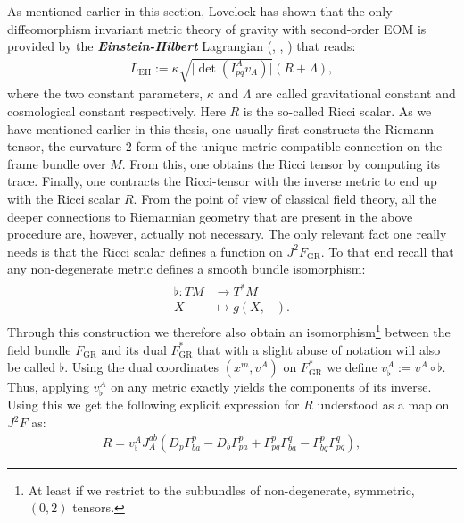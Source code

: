 As mentioned earlier in this section, Lovelock has shown that the only diffeomorphism invariant metric theory of gravity with second-order EOM is provided by the \textit{\textbf{Einstein-Hilbert}} Lagrangian (\cite{Lovelock1969}, \cite{doi:10.1063/1.1665613}, \cite{doi:10.1063/1.1666069}) that reads:
\begin{align}
    L_{\text{EH}} := \kappa \sqrt{\vert \operatorname{det} \left ( I^A_{pq}v_A \right ) \vert }  \left( R + \Lambda \right ),
\end{align}
where the two constant parameters, $\kappa$ and $\Lambda$ are called gravitational constant and cosmological constant respectively. Here $R$ is the so-called Ricci scalar. As we have mentioned earlier in this thesis, one usually first constructs the Riemann tensor, the curvature  $2$-form of the unique metric compatible connection on the frame bundle over $M$. From this, one obtains the Ricci tensor by computing its trace. Finally, one contracts the Ricci-tensor with the inverse metric to end up with the Ricci scalar $R$. From the point of view of classical field theory, all the deeper connections to Riemannian geometry that are present in the above procedure are, however, actually not necessary. The only relevant fact one really needs is that the Ricci scalar defines a function on $J^2F_{\text{GR}}$. To that end recall that any non-degenerate metric defines a smooth bundle isomorphism:
\begin{align}\label{music}
\begin{aligned}
\flat : TM &\longrightarrow T^{\ast}M\\
X &\longmapsto g(X,-) .
\end{aligned}
\end{align}
Through this construction we therefore also obtain an isomorphism\footnote{At least if we restrict to the subbundles of non-degenerate, symmetric, $(0,2)$ tensors.} between the field bundle $F_{\text{GR}}$ and its dual $F_{\text{GR}}^{\ast}$ that with a slight abuse of notation will also be called $\flat$. 
Using the dual coordinates $(x^m,v^A)$ on $F_{\text{GR}}^{\ast}$ we define $v^A_{\flat} := v^A \circ \flat$. Thus, applying $v^A_{\flat}$ on any metric exactly yields the components of its inverse. Using this we get the following explicit expression for $R$ understood as a map on $J^2F$ as:
\begin{align}
R = v_{\flat}^A J_A^{ab} \left ( D_p \Gamma^p_{ba} - D_b \Gamma^p_{pa} + \Gamma^p_{pq} \Gamma^q_{ba} - \Gamma^p_{bq} \Gamma^q_{pq} \right ),
\end{align}
